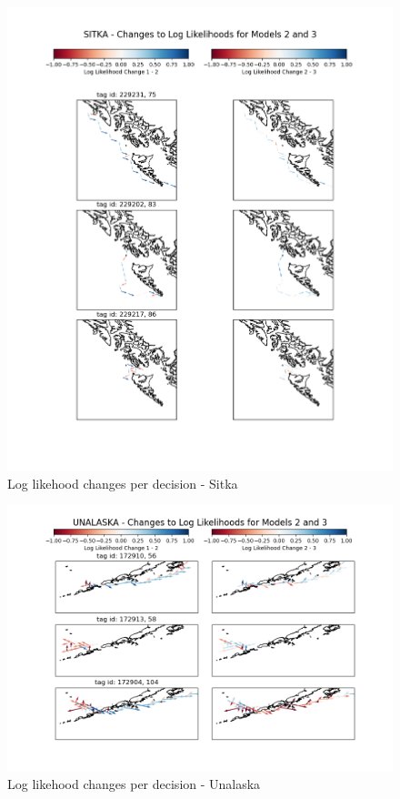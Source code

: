 \documentclass[11pt]{article}
\begin{document}
\begin{figure}[h!] 
	\centering
  \includegraphics[width=140mm]{figures/sitka_map.png}
  \caption{Log likehood changes per decision - Sitka}
  \label{fig:sitka_map}
\end{figure}

\begin{figure}[h!] 
	\centering
  \includegraphics[width=140mm]{figures/unalaska_map.png}
  \caption{Log likehood changes per decision - Unalaska}
  \label{fig:unalaska_map}
\end{figure}
\end{document}
